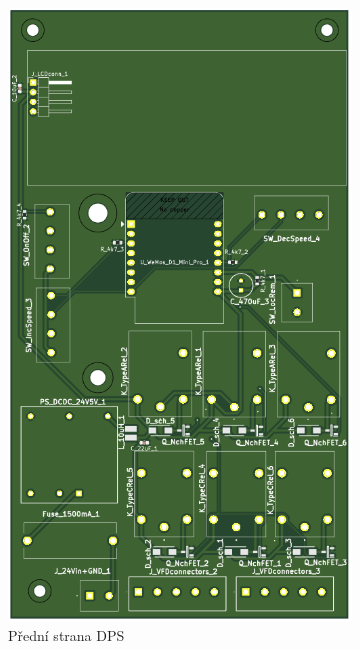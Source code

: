 \begin{figure}[H]
    \centering
    \begin{subfigure}[t]{0.48\textwidth}
        \includegraphics[width=\textwidth]{images/PCBfront.png}
        \caption{Přední strana DPS}
        \label{fig:PCBfront}
    \end{subfigure}%
    \hfill
    \begin{subfigure}[t]{0.48\textwidth}

\end{subfigure}
\end{figure}
